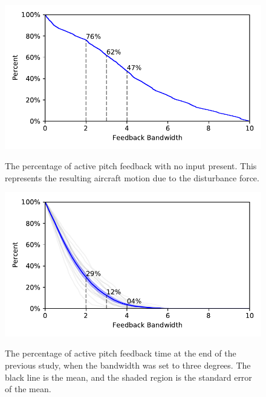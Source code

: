 \begin{figure}[tbp]
    \begin{center}
        \includegraphics[width=\linewidth]{figures/Aircraft/no_input_feedback_on.pdf}
        \caption[The percentage of active pitch feedback with no input present]{The percentage of active pitch feedback with no input present. This represents the resulting aircraft motion due to the disturbance force.}
        \label{figure-aircraft:noinput_pitchfeedback}
        \includegraphics[width=\linewidth]{figures/Aircraft/p34_feedback_on.pdf}
        \caption[The percentage of active pitch feedback time at the end of the previous study]{The percentage of active pitch feedback time at the end of the previous study, when the bandwidth was set to three degrees. The black line is the mean, and the shaded region is the standard error of the mean.}
        \label{figure-aircraft:pitchfeedback}
    \end{center}
\end{figure}

